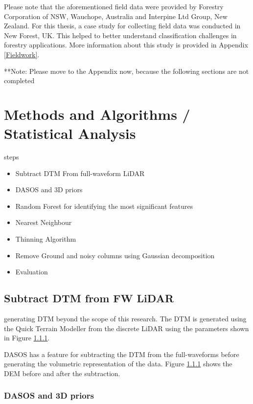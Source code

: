 \documentclass{subfiles}
\begin{document}
\par Please note that the aforementioned field data were provided by Forestry Corporation of NSW, Wauchope, Australia and Interpine Ltd Group, New Zealand. For this thesis, a case study for collecting field data was conducted in New Forest, UK. This helped to better understand classification challenges in forestry applications. More information about this study is provided in Appendix \ref{Fieldwork}.

{\color{red} **Note: Please move to the Appendix now, because the following sections are not completed}

\section{Methods and Algorithms / Statistical Analysis}

\par steps

\begin{itemize}
	\item Subtract DTM From full-waveform LiDAR
	\item DASOS and 3D priors
	\item Random Forest for identifying the most significant features
	\item Nearest Neighbour 
	\item Thinning Algorithm
	\item Remove Ground and noisy columns using Gaussian decomposition
	\item Evaluation
\end{itemize}

\subsection{Subtract DTM from FW LiDAR}\label{sec:DTMsub}

\par generating DTM beyond the scope of this research. The DTM is generated using the Quick Terrain Modeller from the discrete LiDAR using the parameters shown in Figure \ref{}. 

DASOS has a feature for subtracting the DTM from the full-waveforms before generating the volumetric representation of the data. Figure \ref{} shows the DEM before and after the subtraction. 

\subsubsection{DASOS and 3D priors}
\end{document}
